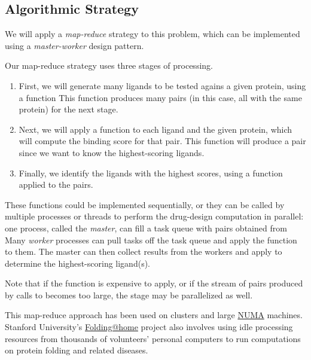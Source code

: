 \documentclass[letterpaper,10pt,openany,oneside]{sphinxmanual}
\begin{document}
\subsection{Algorithmic Strategy}
\label{intro/intro:algorithmic-strategy}
We will apply a \emph{map-reduce} strategy to this problem, which can be implemented using a \emph{master-worker} design pattern.

Our map-reduce strategy uses three stages of processing.
\begin{enumerate}
\item {} 
First, we will generate many ligands to be tested agains a given protein, using a function  This function produces many  pairs (in this case, all with the same protein) for the next stage.

\item {} 
Next, we will apply a  function to each ligand and the given protein,       which will compute the binding score for that  pair. This  function will produce a pair  since we want to know the highest-scoring ligands.

\item {} 
Finally, we identify the ligands with the highest scores, using a function  applied to the  pairs.

\end{enumerate}

These functions could be implemented sequentially, or they can be called by multiple processes or threads to perform the drug-design computation in parallel: one process, called the \emph{master}, can fill a task queue with pairs obtained from 
Many \emph{worker} processes can pull tasks off the task queue and apply the function  to them. The master can then collect results from the workers and apply  to determine the highest-scoring ligand(s).

Note that if the  function is expensive to apply, or if the stream of  pairs produced by calls to  becomes too large, the  stage may be parallelized as well.

This map-reduce approach has been used on clusters and large \href{http://en.wikipedia.org/wiki/Non-Uniform\_Memory\_Access}{NUMA} machines. Stanford University's \href{http://folding.stanford.edu/}{Folding@home} project also involves using idle processing resources from thousands of volunteers' personal computers to run computations on protein folding and related diseases.
\end{document}
